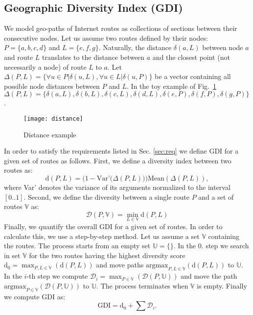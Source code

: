 \documentclass[peerreview]{IEEEtran}
\begin{document}
\subsection{Geographic Diversity Index (GDI)}

We model geo-paths of Internet routes as collections of sections between their
consecutive nodes. Let us assume two routes defined by their nodes: $P=\{a, b,
c, d\}$ and $L=\{e, f, g\}$. Naturally, the distance $ \delta(a,L)$ between node
$a$ and route $L$ translates to the distance between $a$ and the closest point
(not necessarily a node) of route $L$ to $a$. Let $\Delta (P, L)=\{\forall u \in
P| \delta(u,L), \forall u \in L| \delta(u,P)\}$ be a vector containing all
possible node distances between $P$ and $L$. In the toy example of
Fig.~\ref{fig:distance_example} $\Delta (P, L)=\{\delta(a,L), \delta(b,L),
\delta(c,L), \delta(d,L), \delta(e,P), \delta(f,P), \delta(g,P)\}$.
\begin{comment}
Naturally, the distance between node $s$ and route P translates to the distance
between $s$ and $t_s$ which is the closest point in route P to $s$. The distance
between route P and route L is defined by the sum of all their node distances
and it is denoted as $d(P, L)$.
\end{comment}
\begin{figure}[b]
  \centering
  \texttt{[image: distance]}
  \caption{Distance example}
  \label{fig:distance_example}
\end{figure}

In order to satisfy the requirements listed in Sec. \ref{sec:req} we define GDI
for a given set of routes as follows. First, we define a diversity index between
two routes as:
\begin{equation}\label{eq:simi}
  \mathrm{d}(P, L) = \Big(1-\text{Var'}\big(\Delta(P, L)\big)\Big)
  \text{Mean}(\Delta(P,L)),
\end{equation}
where Var' denotes the variance of its arguments normalized to the interval
$[0..1]$. Second, we define the diversity between a single route $P$ and a set
of routes $\mathbb{V}$ as:
\begin{equation}\label{eq:dev}
\mathcal{D}(P,\mathbb{V}) = \min_{L \in \mathbb{V}}\mathrm{d}(P, L)
\end{equation}
Finally, we quantify the overall GDI for a given set of routes. In order to
calculate this, we use a step-by-step method. Let us assume a set $\mathbb{V}$
containing the routes. The process starts from an empty set $\mathbb{U}=\{\}$.
In the $0$. step we search in set $\mathbb{V}$ for the two routes having the
highest diversity score $\mathrm{d}_{0}=\max_{P,L \in \mathbb{V}}(\mathrm{d}(P,
L))$ and move paths $\text{argmax}_{P,L \in \mathbb{V}}(\mathrm{d}(P, L))$ to
$\mathbb{U}$. In the $i$-th step we compute $\mathcal{D}_{i}=\max_{P \in
  \mathbb{V}}(\mathcal{D}(P, \mathbb{U}))$ and move the path $\text{argmax}_{P
  \in \mathbb{V}}(\mathcal{D}(P, \mathbb{U}))$ to $\mathbb{U}$. The process
terminates when $\mathbb{V}$ is empty. Finally we compute GDI as:
\begin{equation}\label{eq:GDI}
\text{GDI} = \mathrm{d}_{0} + \sum \mathcal{D}_{i}.
\end{equation}
\end{document}
